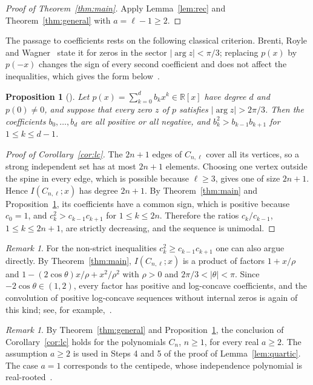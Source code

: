 \documentclass{amsart}
\newtheorem{proposition}[theorem]{Proposition}
\theoremstyle{remark}
\newtheorem{remark}[theorem]{Remark}
\numberwithin{equation}{section}
\newcommand{\R}{\mathbb{R}}
\begin{document}
\begin{proof}[Proof of Theorem~\ref{thm:main}]
Apply Lemma~\ref{lem:rec} and Theorem~\ref{thm:general} with
$a=\ell-1\ge 2$.
\end{proof}

The passage to coefficients rests on the following classical criterion.
Brenti, Royle and Wagner~\cite[Proposition~1.2]{BRW} state it for zeros in
the sector $|\arg z|<\pi/3$; replacing $p(x)$ by $p(-x)$ changes the sign of
every second coefficient and does not affect the inequalities, which gives
the form below~\cite[Corollary~2.3]{BC}.

\begin{proposition}[\cite{BRW,BC}]\label{prop:sector}
Let $p(x)=\sum_{k=0}^d b_kx^k\in\R[x]$ have degree $d$ and $p(0)\ne 0$,
and suppose that every zero $z$ of $p$ satisfies $|\arg z|>2\pi/3$. Then the coefficients
$b_0,\dots,b_d$ are all positive or all negative, and
$b_k^2>b_{k-1}b_{k+1}$ for $1\le k\le d-1$.
\end{proposition}

\begin{proof}[Proof of Corollary~\ref{cor:lc}]
The $2n+1$ edges of $C_{n,\ell}$ cover all its vertices, so a strong
independent set has at most $2n+1$ elements. Choosing one vertex outside the
spine in every edge, which is possible because $\ell\ge 3$, gives one of
size $2n+1$. Hence $I(C_{n,\ell};x)$ has degree $2n+1$. By
Theorem~\ref{thm:main} and Proposition~\ref{prop:sector}, its coefficients
have a common sign, which is positive because $c_0=1$, and
$c_k^2>c_{k-1}c_{k+1}$ for $1\le k\le 2n$. Therefore the ratios
$c_k/c_{k-1}$, $1\le k\le 2n+1$, are strictly decreasing, and the sequence
is unimodal.
\end{proof}

\begin{remark}\label{rem:weak}
For the non-strict inequalities $c_k^2\ge c_{k-1}c_{k+1}$ one can also argue
directly. By Theorem~\ref{thm:main}, $I(C_{n,\ell};x)$ is a product of
factors $1+x/\rho$ and $1-(2\cos\theta)x/\rho+x^2/\rho^2$ with $\rho>0$ and
$2\pi/3<|\theta|<\pi$. Since $-2\cos\theta\in(1,2)$, every factor has
positive and log-concave coefficients, and the convolution of positive
log-concave sequences without internal zeros is again of this kind; see,
for example,~\cite{Karlin}.
\end{remark}

\begin{remark}
By Theorem~\ref{thm:general} and Proposition~\ref{prop:sector}, the
conclusion of Corollary~\ref{cor:lc} holds for the polynomials $C_n$,
$n\ge 1$, for every real $a\ge 2$. The assumption $a\ge 2$ is used in Steps
4 and 5 of the proof of Lemma~\ref{lem:quartic}. The case $a=1$ corresponds
to the centipede, whose independence polynomial is real-rooted~\cite{Zhu}.
\end{remark}
\end{document}
